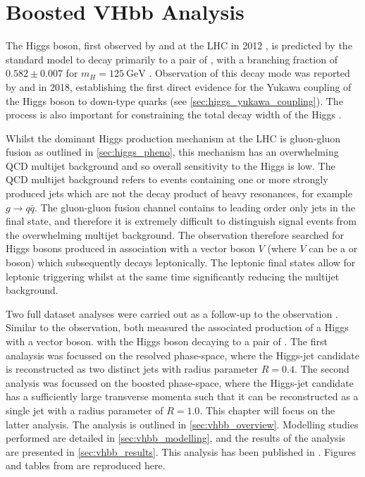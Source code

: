 
\chapter{Boosted VHbb Analysis}\label{chap:vhbb_boosted}

The Higgs boson, first observed by \ATLAS and \CMS at the LHC in 2012 \cite{HIGG-2012-27,CMS-HIG-12-028}, is predicted by the standard model to decay primarily to a pair of \bquarks, with a branching fraction of $0.582 \pm 0.007$ for $m_H = \SI{125}{\GeV}$ \cite{deFlorian:2016spz}. 
Observation of this decay mode was reported by \ATLAS \cite{HIGG-2018-04} and \CMS \cite{CMS-HIG-18-016} in 2018, establishing the first direct evidence for the Yukawa coupling of the Higgs boson to down-type quarks (see \cref{sec:higgs_yukawa_coupling}).
The \Hbb process is also important for constraining the total decay width of the Higgs \cite{Lafaye:2009vr}.

Whilst the dominant Higgs production mechanism at the LHC is gluon-gluon fusion as outlined in \cref{sec:higgs_pheno}, this mechanism has an overwhelming QCD multijet background and so overall sensitivity to the Higgs is low.
The QCD multijet background refers to events containing one or more strongly produced jets which are not the decay product of heavy resonances, for example $g \to q\bar{q}$.
The gluon-gluon fusion channel contains to leading order only jets in the final state, and therefore it is extremely difficult to distinguish signal events from the overwhelming multijet background.
The \hbb observation therefore searched for Higgs bosons produced in association with a vector boson $V$ (where $V$ can be a \Wboson or \Zboson boson) which subsequently decays leptonically.
The leptonic final states allow for leptonic triggering whilst at the same time significantly reducing the multijet background.

Two full \runtwo dataset analyses were carried out as a follow-up to the \Hbb observation \cite{HIGG-2018-04}.
Similar to the observation, both measured the associated production of a Higgs with a vector boson. with the Higgs boson decaying to a pair of \bquarks.
The first analaysis \cite{HIGG-2018-51} was focussed on the resolved phase-space, where the Higgs-jet candidate is reconstructed as two distinct jets with radius parameter $R = 0.4$.
The second analysis \cite{HIGG-2018-52} was focussed on the boosted phase-space, where the Higgs-jet candidate has a sufficiently large transverse momenta such that it can be reconstructed as a single jet with a radius parameter of $R = 1.0$.
This chapter will focus on the latter analysis.
The analysis is outlined in \cref{sec:vhbb_overview}.
Modelling studies performed are detailed in \cref{sec:vhbb_modelling}, and the results of the analysis are presented in \cref{sec:vhbb_results}.
This analysis has been published in .
Figures and tables from  are reproduced here.


